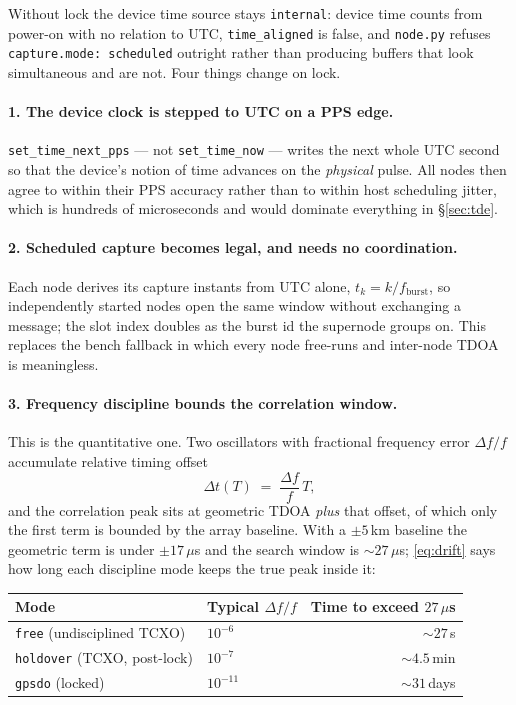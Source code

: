 \documentclass[11pt,a4paper]{article}
\newcommand{\code}[1]{\texttt{\small #1}}
\begin{document}
Without lock the device time source stays \code{internal}: device time counts
from power-on with no relation to UTC, \code{time\_aligned} is false, and
\code{node.py} refuses \code{capture.mode: scheduled} outright rather than
producing buffers that look simultaneous and are not. Four things change on
lock.

\paragraph{1. The device clock is stepped to UTC on a PPS edge.}
\code{set\_time\_next\_pps} --- not \code{set\_time\_now} --- writes the next
whole UTC second so that the device's notion of time advances on the
\emph{physical} pulse. All nodes then agree to within their PPS accuracy rather
than to within host scheduling jitter, which is hundreds of microseconds and
would dominate everything in \S\ref{sec:tde}.

\paragraph{2. Scheduled capture becomes legal, and needs no coordination.}
Each node derives its capture instants from UTC alone,
$t_k = k/f_{\text{burst}}$, so independently started nodes open the same window
without exchanging a message; the slot index doubles as the burst id the
supernode groups on. This replaces the bench fallback in which every node
free-runs and inter-node TDOA is meaningless.

\paragraph{3. Frequency discipline bounds the correlation window.} This is the
quantitative one. Two oscillators with fractional frequency error
$\Delta f/f$ accumulate relative timing offset
\begin{equation}
\Delta t(T) \;=\; \frac{\Delta f}{f}\,T ,
\label{eq:drift}
\end{equation}
and the correlation peak sits at geometric TDOA \emph{plus} that offset, of
which only the first term is bounded by the array baseline. With a
$\pm 5$\,km baseline the geometric term is under $\pm 17\,\mu$s and the search
window is $\sim\!27\,\mu$s; \eqref{eq:drift} says how long each discipline mode
keeps the true peak inside it:

\begin{center}
\small
\begin{tabular}{@{}llr@{}}
\toprule
\textbf{Mode} & \textbf{Typical $\Delta f/f$} & \textbf{Time to exceed $27\,\mu$s} \\
\midrule
\code{free} (undisciplined TCXO)  & $10^{-6}$   & $\sim\!27$\,s \\
\code{holdover} (TCXO, post-lock) & $10^{-7}$   & $\sim\!4.5$\,min \\
\code{gpsdo} (locked)             & $10^{-11}$  & $\sim\!31$\,days \\
\bottomrule
\end{tabular}
\end{center}
\end{document}
